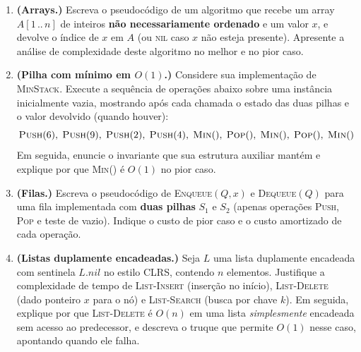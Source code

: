 \documentclass[9pt,a4paper]{extarticle}
\newcommand{\impt}[1]{\textcolor{important}{\textbf{#1}}}
\begin{document}
\begin{enumerate}[label=\textbf{\arabic*.}, leftmargin=*, itemsep=2em]

\item \textbf{(Arrays.)}
  Escreva o pseudocódigo de um algoritmo que recebe um array \(A[1\,..\,n]\) de
  inteiros \impt{não necessariamente ordenado} e um valor \(x\), e devolve o
  índice de \(x\) em \(A\) (ou \textsc{nil} caso \(x\) não esteja presente).
  Apresente a análise de complexidade deste algoritmo no melhor e no pior caso.

\item \textbf{(Pilha com mínimo em \(O(1)\).)}
  Considere sua implementação de \textsc{MinStack}.
  Execute a sequência de operações abaixo sobre uma instância inicialmente vazia,
  mostrando após cada chamada o estado das duas pilhas e o valor devolvido
  (quando houver):
  \[
    \textsc{Push}(6),\;
    \textsc{Push}(9),\;
    \textsc{Push}(2),\;
    \textsc{Push}(4),\;
    \textsc{Min}(),\;
    \textsc{Pop}(),\;
    \textsc{Min}(),\;
    \textsc{Pop}(),\;
    \textsc{Min}()
  \]
  Em seguida, enuncie o invariante que sua estrutura auxiliar mantém e explique
  por que \textsc{Min}() é \(O(1)\) no pior caso.

\item \textbf{(Filas.)}
  Escreva o pseudocódigo de \textsc{Enqueue}$(Q, x)$ e \textsc{Dequeue}$(Q)$ para
  uma fila implementada com \impt{duas pilhas} \(S_1\) e \(S_2\) (apenas operações
  \textsc{Push}, \textsc{Pop} e teste de vazio). Indique o custo de pior caso e o
  custo amortizado de cada operação.

\item \textbf{(Listas duplamente encadeadas.)}
  Seja \(L\) uma lista duplamente encadeada com sentinela \(L.\mathit{nil}\) no
  estilo CLRS, contendo \(n\) elementos.
  Justifique a complexidade de tempo de \textsc{List-Insert} (inserção no início),
  \textsc{List-Delete} (dado ponteiro \(x\) para o nó) e \textsc{List-Search}
  (busca por chave \(k\)).
  Em seguida, explique por que \textsc{List-Delete} é \(O(n)\) em uma lista
  \emph{simplesmente} encadeada sem acesso ao predecessor, e descreva o truque
  que permite \(O(1)\) nesse caso, apontando quando ele falha.


\end{enumerate}
\end{document}
